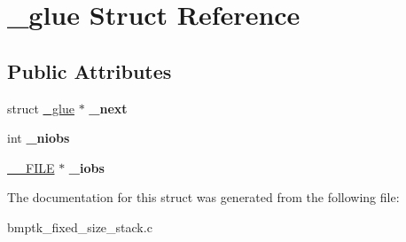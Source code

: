 \hypertarget{struct__glue}{}\section{\+\_\+glue Struct Reference}
\label{struct__glue}
\subsection*{Public Attributes}
\begin{DoxyCompactItemize}
\item 
struct \hyperlink{struct__glue}{\+\_\+glue} $\ast$ {\bfseries \+\_\+next}\hypertarget{struct__glue_a36aa1d74acfa84ec0d7622c353a4745d}{}\label{struct__glue_a36aa1d74acfa84ec0d7622c353a4745d}

\item 
int {\bfseries \+\_\+niobs}\hypertarget{struct__glue_a52e1b031ad76dae3a2fd0ca13a4c75f3}{}\label{struct__glue_a52e1b031ad76dae3a2fd0ca13a4c75f3}

\item 
\hyperlink{struct____s_f_i_l_e}{\+\_\+\+\_\+\+F\+I\+LE} $\ast$ {\bfseries \+\_\+iobs}\hypertarget{struct__glue_abc1268f2db4ee91ac99e779eb2e08ff3}{}\label{struct__glue_abc1268f2db4ee91ac99e779eb2e08ff3}

\end{DoxyCompactItemize}


The documentation for this struct was generated from the following file\+:\begin{DoxyCompactItemize}
\item 
bmptk\+\_\+fixed\+\_\+size\+\_\+stack.\+c\end{DoxyCompactItemize}
